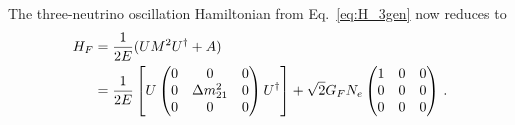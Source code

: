 The three-neutrino oscillation Hamiltonian from Eq.~\eqref{eq:H_3gen}
now reduces to 
\begin{align}
    H_F &= \frac{1}{2E}(U M^2 U^\dagger + A) \nonumber \\
        &= \frac{1}{2E}\left[U \begin{pmatrix}
            0 & 0 & 0 \\
            0 & \dm_{21} & 0 \\
            0 & 0 & 0
        \end{pmatrix} U^\dagger\right] + \sqrt{2}G_F N_e \begin{pmatrix}
            1 & 0 & 0 \\
            0 & 0 & 0 \\
            0 & 0 & 0
        \end{pmatrix}\,. 
\end{align}
